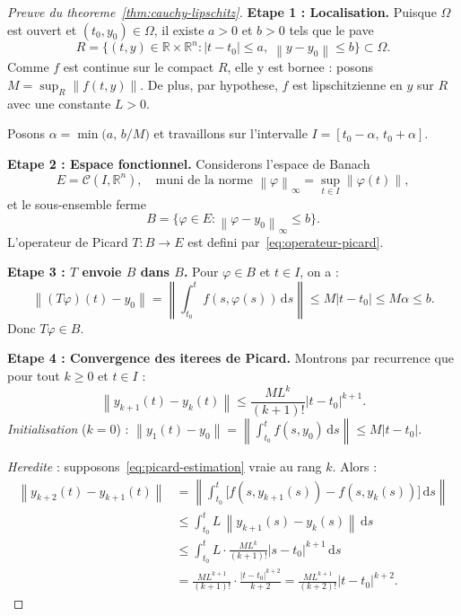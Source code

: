 \documentclass[12pt,a4paper,openany]{book}
\theoremstyle{definition}
\theoremstyle{plain}
\theoremstyle{remark}
\newcommand{\R}{\mathbb{R}}
\newcommand{\dd}{\mathrm{d}}
\newcommand{\abs}[1]{\left|#1\right|}
\newcommand{\norm}[1]{\left\|#1\right\|}
\begin{document}
\begin{proof}[Preuve du theoreme~\ref{thm:cauchy-lipschitz}]
\textbf{Etape 1 : Localisation.}
Puisque $\Omega$ est ouvert et $(t_0, y_0) \in \Omega$, il existe $a > 0$ et $b > 0$ tels que le pave
\[
  R = \bigl\{ (t,y) \in \R \times \R^n : \abs{t - t_0} \leq a, \; \norm{y - y_0} \leq b \bigr\} \subset \Omega.
\]
Comme $f$ est continue sur le compact $R$, elle y est bornee : posons $M = \sup_R \norm{f(t,y)}$. De plus, par hypothese, $f$ est lipschitzienne en $y$ sur $R$ avec une constante $L > 0$.

Posons $\alpha = \min\bigl(a, \, b/M\bigr)$ et travaillons sur l'intervalle $I = [t_0 - \alpha, \, t_0 + \alpha]$.

\medskip
\textbf{Etape 2 : Espace fonctionnel.}
Considerons l'espace de Banach
\[
  E = \mathcal{C}(I, \R^n), \quad \text{muni de la norme } \norm{\varphi}_\infty = \sup_{t \in I} \norm{\varphi(t)},
\]
et le sous-ensemble ferme
\[
  B = \bigl\{ \varphi \in E : \norm{\varphi - y_0}_\infty \leq b \bigr\}.
\]
L'operateur de Picard $T : B \to E$ est defini par~\eqref{eq:operateur-picard}.

\medskip
\textbf{Etape 3 : $T$ envoie $B$ dans $B$.}
Pour $\varphi \in B$ et $t \in I$, on a :
\[
  \norm{(T\varphi)(t) - y_0} = \norm{\int_{t_0}^{t} f(s, \varphi(s))\, \dd s} \leq M \abs{t - t_0} \leq M \alpha \leq b.
\]
Donc $T\varphi \in B$.

\medskip
\textbf{Etape 4 : Convergence des iterees de Picard.}
Montrons par recurrence que pour tout $k \geq 0$ et $t \in I$ :
\begin{equation}\label{eq:picard-estimation}
\norm{y_{k+1}(t) - y_k(t)} \leq \frac{M L^k}{(k+1)!} \abs{t - t_0}^{k+1}.
\end{equation}
\emph{Initialisation} ($k = 0$) : $\norm{y_1(t) - y_0} = \norm{\int_{t_0}^t f(s, y_0)\, \dd s} \leq M \abs{t - t_0}$. \checkmark

\emph{Heredite} : supposons~\eqref{eq:picard-estimation} vraie au rang $k$. Alors :
\begin{align*}
\norm{y_{k+2}(t) - y_{k+1}(t)}
  &= \norm{\int_{t_0}^{t} \bigl[f(s, y_{k+1}(s)) - f(s, y_k(s))\bigr]\, \dd s} \\
  &\leq \int_{t_0}^{t} L \, \norm{y_{k+1}(s) - y_k(s)} \, \dd s \\
  &\leq \int_{t_0}^{t} L \cdot \frac{M L^k}{(k+1)!} \abs{s - t_0}^{k+1} \, \dd s \\
  &= \frac{M L^{k+1}}{(k+1)!} \cdot \frac{\abs{t - t_0}^{k+2}}{k+2}
  = \frac{M L^{k+1}}{(k+2)!} \abs{t - t_0}^{k+2}.
\end{align*}


\end{proof}
\end{document}
